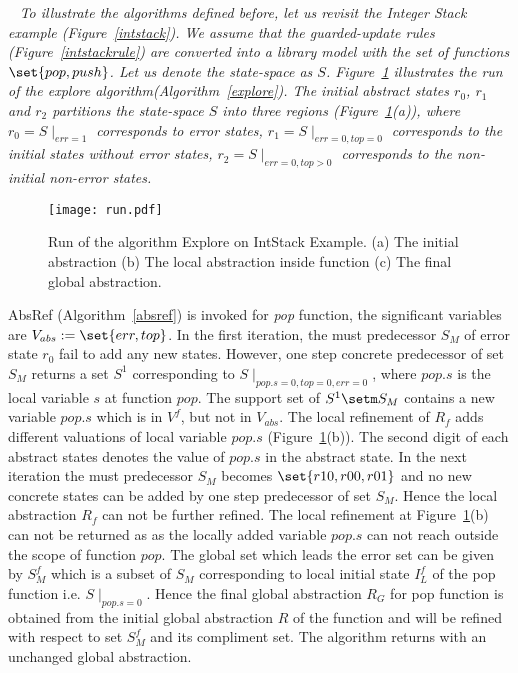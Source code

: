 \documentclass{llncs}
\begin{document}
\begin{example} 
~\em
To illustrate the algorithms defined before, let us revisit the Integer Stack example (Figure~\ref{intstack}).
We assume that the guarded-update rules (Figure~\ref{intstackrule}) are converted into a 
library model with the set of functions $\set{pop, push}$.
Let us denote the state-space as $S$.
Figure~\ref{fig-run} illustrates the run of the explore algorithm(Algorithm~\ref{explore}).
The initial abstract states $r_0$, $r_1$ and $r_2$ partitions the state-space $S$ into three regions
(Figure~\ref{fig-run}(a)), where $r_0 = S\mid_{err=1}$ corresponds to error states,
$r_1 = S \mid_{err=0, top=0}$ corresponds to the initial states without error states, $r_2 =
S\mid_{err=0,top>0}$ corresponds to the non-initial non-error states. 
\begin{figure}[htb]
\centering
\texttt{[image: run.pdf]}
\caption{Run of the algorithm Explore on IntStack Example. (a) The initial abstraction (b) The local
abstraction inside function (c) The final global abstraction.}
\label{fig-run}
\end{figure}
AbsRef (Algorithm~\ref{absref}) is invoked for {\em pop} function, the significant variables are
$V_{abs} := \set{err,top}$.
In the first iteration, the must predecessor $S_M$ of error state $r_0$ fail to add any new states. 
However, one step concrete predecessor of set $S_M$ returns a set  $S^1$ 
corresponding to $S\mid_{pop.s=0,top=0,err=0}$, where $pop.s$ is the local variable $s$ at function $pop$.
The support set of $S^1 \setm S_M$ contains a new variable $pop.s$ which is in $V^f$, but not  in 
$V_{abs}$. 
The local refinement of $R_f$ adds different valuations of local variable $pop.s$ (Figure~\ref{fig-run}(b)). 
The second digit of each abstract states denotes the value of $pop.s$ in the abstract state.
In the next iteration the must predecessor $S_M$ becomes $\set{r10,r00,r01}$ and no new concrete states can be added by one step predecessor of set $S_M$.
Hence the local abstraction $R_f$ can not be further refined.
The local refinement at Figure~\ref{fig-run}(b) can not be returned as as  the locally added variable $pop.s$ can not reach outside the scope of function $pop$.
The global set which leads the error set can be given by $S^f_M$ which is a subset of $S_M$ corresponding to local initial state $I^f_L$ of the pop function i.e. $S \mid_{pop.s = 0}$.
Hence the final global abstraction $R_G$ for pop function is obtained from the initial 
global abstraction $R$ of the function and will be refined with respect to set $S^f_M$ and its 
compliment set.
The algorithm returns with an unchanged global abstraction. 


\end{example}
\end{document}
